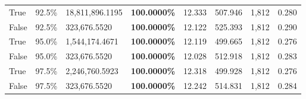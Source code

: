 \begin{table}[H]
\begin{tabular}{lllrllll}
\cline{1-8}
True & 92.5\% & 18,811,896.1195 & \bfseries \color{red} 100.0000\% & 12.333 & 507.946 & 1,812 & 0.280 \\
\cline{1-8}
False & 92.5\% & 323,676.5520 & \bfseries \color{red} 100.0000\% & 12.122 & 525.393 & 1,812 & 0.290 \\
\cline{1-8}
True & 95.0\% & 1,544,174.4671 & \bfseries \color{red} 100.0000\% & 12.119 & 499.665 & 1,812 & 0.276 \\
\cline{1-8}
False & 95.0\% & 323,676.5520 & \bfseries \color{red} 100.0000\% & 12.028 & 512.918 & 1,812 & 0.283 \\
\cline{1-8}
True & 97.5\% & 2,246,760.5923 & \bfseries \color{red} 100.0000\% & 12.318 & 499.928 & 1,812 & 0.276 \\
\cline{1-8}
False & 97.5\% & 323,676.5520 & \bfseries \color{red} 100.0000\% & 12.242 & 514.831 & 1,812 & 0.284 \\
\cline{1-8}
\bottomrule
\end{tabular}
\end{table}
